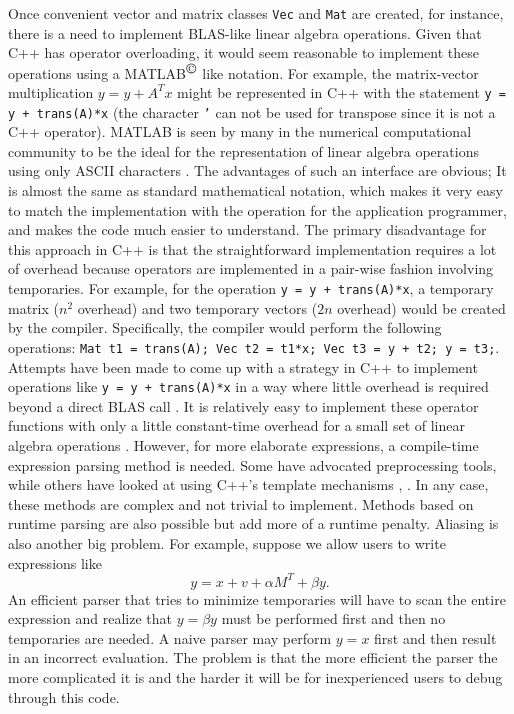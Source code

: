 \documentclass[acmtoms,acmnow]{acmtrans2m}
\begin{document}
Once convenient vector and matrix classes {}\texttt{Vec} and {}\texttt{Mat}
are created, for instance, there is a need to implement BLAS-like linear
algebra operations.  Given that C++ has operator overloading, it would seem
reasonable to implement these operations using a
MATLAB${}^{\mbox{\copyright}}$ like notation.  For example, the matrix-vector
multiplication $y = y + A^T x$ might be represented in C++ with the statement
{}\texttt{y = y + trans(A)*x} (the character {}\texttt{'} can not be used for
transpose since it is not a C++ operator).  MATLAB is seen by many in the
numerical computational community to be the ideal for the representation of
linear algebra operations using only ASCII characters
{}\cite{ref:demmel_1997}.  The advantages of such an interface are obvious; It
is almost the same as standard mathematical notation, which makes it very easy
to match the implementation with the operation for the application programmer,
and makes the code much easier to understand.  The primary disadvantage for
this approach in C++ is that the straightforward implementation requires a lot
of overhead because operators are implemented in a pair-wise fashion involving
temporaries.  For example, for the operation {}\texttt{y = y + trans(A)*x}, a
temporary matrix ($n^2$ overhead) and two temporary vectors ($2n$ overhead)
would be created by the compiler.  Specifically, the compiler would perform
the following operations: {}\texttt{Mat t1 = trans(A); Vec t2 = t1*x; Vec t3 =
y + t2; y = t3;}.  Attempts have been made to come up with a strategy in C++
to implement operations like {}\texttt{y = y + trans(A)*x} in a way where
little overhead is required beyond a direct BLAS call
{}\cite{ref:parker_1997}.  It is relatively easy to implement these operator
functions with only a little constant-time overhead for a small set of linear
algebra operations {}\cite[pages 675-677]{ref:stroustrup_1997}.  However, for
more elaborate expressions, a compile-time expression parsing method is
needed.  Some have advocated preprocessing tools, while others have looked at
using C++'s template mechanisms {}\cite{ref:veldhuizen_et_al_1998},
{}\cite{ref:parker_1997}.  In any case, these methods are complex and not
trivial to implement.  Methods based on runtime parsing are also possible but
add more of a runtime penalty.  Aliasing is also another big problem.  For
example, suppose we allow users to write expressions like
%
\[
y = x + v + \alpha M^{T} + \beta y.
\]
%
An efficient parser that tries to minimize temporaries will have to scan the
entire expression and realize that $y = \beta y$ must be performed first and
then no temporaries are needed.  A naive parser may perform $y = x$ first and
then result in an incorrect evaluation.  The problem is that the more
efficient the parser the more complicated it is and the harder it will be for
inexperienced users to debug through this code.
\end{document}
